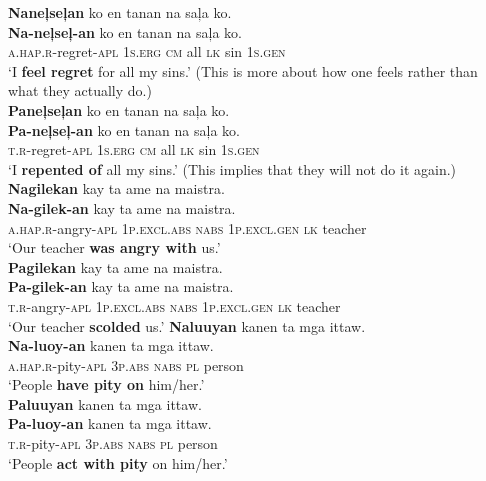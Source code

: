 \ea
    \ea
    \textbf{Naneļseļan}  ko  en  tanan  na  saļa  ko. \\\smallskip
\gll \textbf{Na-neļseļ-an}  ko  en  tanan  na  saļa  ko. \\
    \textsc{a.hap.r}-regret-\textsc{apl}  1\textsc{s.erg}  \textsc{cm}  all  \textsc{lk}  sin  1\textsc{s.gen} \\
    \glt ‘I \textbf{feel regret} for all my sins.’ (This is more about how one feels rather than what they actually do.) \\
    \ex
    \textbf{Paneļseļan}  ko  en  tanan  na  saļa  ko. \\\smallskip
\gll \textbf{Pa-neļseļ-an}  ko  en  tanan  na  saļa  ko. \\
    \textsc{t.r}-regret-\textsc{apl}  1\textsc{s.erg}  \textsc{cm}  all  \textsc{lk}  sin  1\textsc{s.gen} \\
    \glt ‘I \textbf{repented of} all my sins.’ (This implies that they will not do it again.)
    \z
\z
\ea
    \ea
    \textbf{Nagilekan}  kay  ta  ame  na  maistra. \\\smallskip
\gll \textbf{Na-gilek-an}  kay  ta  ame  na  maistra. \\
    \textsc{a.hap.r}-angry-\textsc{apl}  1\textsc{p.excl.abs}  \textsc{nabs}  1\textsc{p.excl.gen}  \textsc{lk}  teacher \\
    \glt ‘Our teacher \textbf{was angry with} us.’ \\
    \ex
    \textbf{Pagilekan}  kay  ta  ame  na  maistra. \\\smallskip
\gll \textbf{Pa-gilek-an}  kay  ta  ame  na  maistra. \\
    \textsc{t.r}-angry-\textsc{apl}  1\textsc{p.excl.abs}  \textsc{nabs}  1\textsc{p.excl.gen}  \textsc{lk}  teacher \\
    \glt ‘Our teacher \textbf{scolded} us.’
    \z
\z
\ea
    \ea
    \textbf{Naluuyan}  kanen  ta  mga  ittaw. \\\smallskip
\gll \textbf{Na-luoy-an}  kanen  ta  mga  ittaw. \\
    \textsc{a.hap.r}-pity-\textsc{apl}  3\textsc{p.abs}  \textsc{nabs}  \textsc{pl}  person \\
    \glt ‘People \textbf{have pity on} him/her.’ \\
    \ex
    \textbf{Paluuyan}  kanen  ta  mga  ittaw. \\\smallskip
\gll \textbf{Pa-luoy-an}  kanen  ta  mga  ittaw. \\
    \textsc{t.r}-pity-\textsc{apl}  3\textsc{p.abs}  \textsc{nabs}  \textsc{pl}  person \\
    \glt ‘People \textbf{act with pity} on him/her.’
    \z
\z

